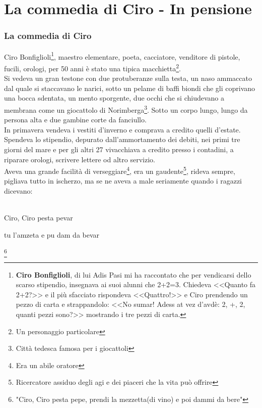 
\chapter{La commedia di Ciro - In pensione}
\subsection{La commedia di Ciro}
Ciro Bonfiglioli\footnote{\textbf{Ciro Bonfiglioli}, di lui Adis Pasi mi ha raccontato che per vendicarsi dello scarso stipendio, insegnava ai suoi alunni che 2+2=3. Chiedeva <<Quanto fa 2+2?>> e il più sfacciato rispondeva <<Quattro!>> e Ciro prendendo un pezzo di carta e strappandolo: <<No sumar! Adess at vez d'avdè: 2, +, 2, quanti pezzi sono?>> mostrando i tre pezzi di carta.}, maestro elementare, poeta, cacciatore, venditore di pistole, fucili, orologi, per 50 anni è stato una tipica macchietta\footnote{Un personaggio particolare}.\\
\indent Si vedeva un gran testone con due protuberanze sulla testa, un naso ammaccato dal quale si staccavano le narici, sotto un pelame di baffi biondi che gli coprivano una bocca sdentata, un mento sporgente, due occhi che si chiudevano a membrana come un giocattolo di Norimberga\footnote{Città tedesca famosa per i giocattoli}. Sotto un corpo lungo, lungo da persona alta e due gambine corte da fanciullo.\\
\indent In primavera vendeva i vestiti d'inverno e comprava a credito quelli d'estate. Spendeva lo stipendio, depurato dall'ammortamento dei debiti, nei primi tre giorni del mare e per gli altri 27 vivacchiava a credito presso i contadini, a riparare orologi, scrivere lettere od altro servizio. \\

\indent Aveva una grande facilità di verseggiare\footnote{Era un abile oratore}, era un gaudente\footnote{Ricercatore assiduo degli agi e dei piaceri che la vita può offrire}, rideva sempre, pigliava tutto in ischerzo, ma se ne aveva a male seriamente quando i ragazzi dicevano: \\\\
\textcal \Huge
	\centerline{Ciro, Ciro pesta pevar}
	\centerline{tu l'amzeta e pu dam da bevar}\normalfont \normalsize\footnote{"Ciro, Ciro pesta pepe, prendi la mezzetta(di vino) e poi dammi da bere"}


